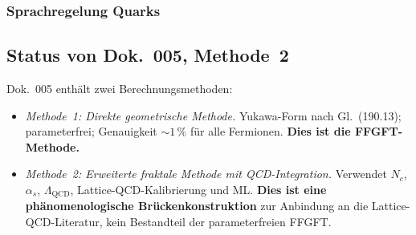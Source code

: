\subsubsection*{Sprachregelung Quarks}

\begin{center}
{\footnotesize
{}
}
\end{center}

\subsection*{Status von Dok.~005, Methode~2}

Dok.~005 enthält zwei Berechnungsmethoden:
\begin{itemize}
  \item \emph{Methode~1: Direkte geometrische Methode.} Yukawa-Form
        nach Gl.~(190.13); parameterfrei; Genauigkeit $\sim 1\,\%$
        für alle Fermionen. \textbf{Dies ist die FFGFT-Methode.}
  \item \emph{Methode~2: Erweiterte fraktale Methode mit
        QCD-Integration.} Verwendet $N_c$, $\alpha_s$,
        $\Lambda_{\text{QCD}}$, Lattice-QCD-Kalibrierung und ML.
        \textbf{Dies ist eine phänomenologische Brückenkonstruktion}
        zur Anbindung an die Lattice-QCD-Literatur, kein Bestandteil
        der parameterfreien FFGFT.
\end{itemize}

